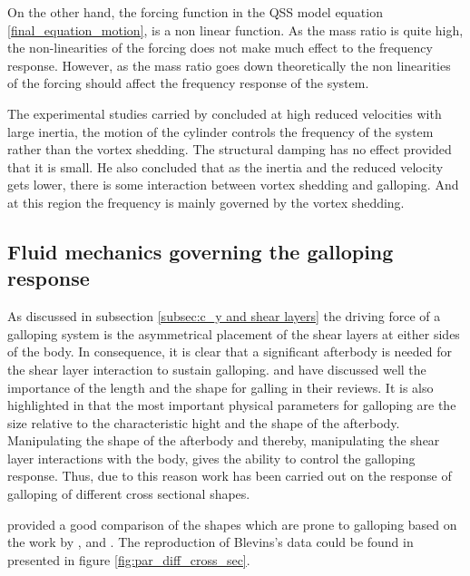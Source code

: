  On the other hand, the forcing function in the QSS model equation \ref{final_equation_motion}, is a non linear function. As the mass ratio is quite high, the non-linearities of the forcing does not make much effect to the frequency response. However, as the mass ratio goes down theoretically the non linearities of the forcing should affect the frequency response of the system.   
 
 The experimental studies carried by \citet{bouclin:77} concluded at high reduced velocities with large inertia, the motion of the cylinder controls the frequency of the system rather than the vortex shedding. The structural damping has no effect provided that it is small. He also concluded that as the inertia and the reduced velocity gets lower, there is some interaction between vortex shedding and galloping. And at this region the frequency is mainly governed by the vortex shedding. 
 
 
 \subsection{Fluid mechanics governing the galloping response}
 
 As discussed in subsection \ref{subsec:c_y and shear layers} the driving force of a galloping system is the asymmetrical placement of the shear layers at either sides of the body. In consequence, it is clear that a significant afterbody is needed for the shear layer interaction to sustain galloping. \citet{Parkinson1974,Parkinson1989} and \citet{Bearman1987} have discussed well the importance of the length and the shape for galling in their reviews. It is also highlighted in \citet{Parkinson1974} that the most important physical parameters for galloping are the size relative to the characteristic hight and the shape of the afterbody. Manipulating the shape of the afterbody and thereby, manipulating the shear layer interactions with the body, gives the ability to control the galloping response. Thus, due to this reason work has been carried out on the response of galloping of different cross sectional shapes. 
 
 \citet{Blevins1990} provided a good comparison of the shapes which are prone to galloping based on the work by \citet{Parkinson1961}, \citet{Nakamura1975a} and \citet{Nakamura1977}. The reproduction of Blevins's data could be found in \citet{Paidoussis2010} presented in figure \ref{fig:par_diff_cross_sec}. 
    
 
  
